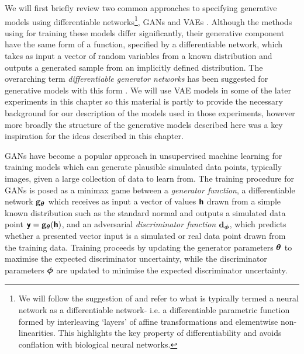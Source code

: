 \begin{figure}[!t]
\label{fig:gan-and-vae-factor-graphs}
\end{figure}

We will first briefly review two common approaches to specifying generative models using differentiable networks\footnote{We will follow the suggestion of \citep{zadeh2016twitter} and refer to what is typically termed a neural network as a differentiable network- i.e. a differentiable parametric function formed by interleaving `layers' of affine transformations and elementwise non-linearities. This highlights the key property of differentiability and avoids conflation with biological neural networks.}, \acfp{GAN} \citep{goodfellow2014generative} and \acfp{VAE} \citep{kingma2013auto,rezende2014stochastic}. Although the methods using for training these models differ significantly, their generative component have the same form of a function, specified by a differentiable network, which takes as input a vector of random variables from a known distribution and outputs a generated sample from an implicitly defined distribution. The overarching term \emph{differentiable generator networks} has been suggested for generative models with this form \citep{goodfellow2016deep}. We will use \ac{VAE} models in some of the later experiments in this chapter so this material is partly to provide the necessary background for our description of the models used in those experiments, however more broadly the structure of the generative models described here was a key inspiration for the ideas described in this chapter.

\acp{GAN} have become a popular approach in unsupervised machine learning for training models which can generate plausible simulated data points, typically images, given a large collection of data to learn from. The training procedure for \acp{GAN} is posed as a minimax game between a \emph{generator function}, a differentiable network ${\mathbf{g}}_{\boldsymbol{\theta}}$ which receives as input a vector of values $\boldsymbol{\mathsf{h}}$ drawn from a simple known distribution such as the standard normal and outputs a simulated data point $\boldsymbol{\mathsf{y}} = {\mathbf{g}}_{\boldsymbol{\theta}}(\boldsymbol{\mathsf{h}})$, and an adversarial \emph{discriminator function} ${\mathbf{d}}_{\boldsymbol{\phi}}$, which predicts whether a presented vector input is a simulated or real data point drawn from the training data.  Training proceeds by updating the generator parameters $\boldsymbol{\theta}$ to maximise the expected discriminator uncertainty, while the discriminator parameters $\boldsymbol{\phi}$ are updated to minimise the expected discriminator uncertainty.

